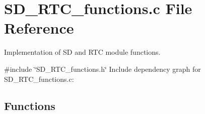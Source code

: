 \section{S\+D\+\_\+\+R\+T\+C\+\_\+functions.\+c File Reference}
\label{_s_d___r_t_c__functions_8c}


Implementation of SD and R\+TC module functions.  


{\ttfamily \#include \char`\"{}S\+D\+\_\+\+R\+T\+C\+\_\+functions.\+h\char`\"{}}\newline
Include dependency graph for S\+D\+\_\+\+R\+T\+C\+\_\+functions.\+c\+:
\subsection*{Functions}
